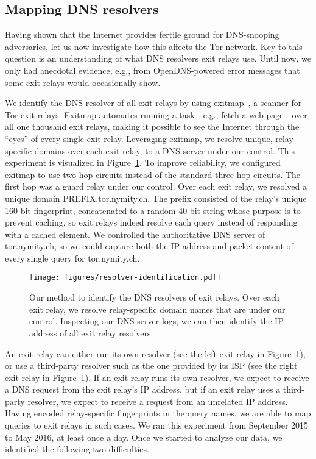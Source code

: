 \subsection{Mapping DNS resolvers}
\label{sec:mapping-resolvers}
Having shown that the Internet provides fertile ground for DNS-snooping
adversaries, let us now investigate how this affects the Tor network.  Key to
this question is an understanding of what DNS resolvers exit relays use.  Until
now, we only had anecdotal evidence, e.g., from OpenDNS-powered error messages
that some exit relays would occasionally show.

We identify the DNS resolver of all exit relays by using
exitmap~\cite{exitmap}, a scanner for Tor exit relays.  Exitmap automates
running a task---e.g., fetch a web page---over all one thousand exit relays,
making it possible to see the Internet through the ``eyes'' of every single
exit relay.  Leveraging exitmap, we resolve unique, relay-specific domains over
each exit relay, to a DNS server under our control.  This experiment is
visualized in Figure~\ref{fig:dnsenum}.  To improve reliability, we configured
exitmap to use two-hop circuits instead of the standard three-hop circuits.
The first hop was a guard relay under our control.  Over each exit relay, we
resolved a unique domain PREFIX.tor.nymity.ch.  The prefix consisted of the
relay's unique 160-bit fingerprint, concatenated to a random 40-bit string
whose purpose is to prevent caching, so exit relays indeed resolve each query
instead of responding with a cached element.  We controlled the authoritative
DNS server of tor.nymity.ch, so we could capture both the IP address and packet
content of every single query for tor.nymity.ch.

\begin{figure}[t]
	\centering
	\texttt{[image: figures/resolver-identification.pdf]}
	\caption{Our method to identify the DNS resolvers of exit relays.  Over
	each exit relay, we resolve relay-specific domain names that are under our
	control.  Inspecting our DNS server logs, we can then identify the IP
	address of all exit relay resolvers.}
	\label{fig:dnsenum}
\end{figure}

An exit relay can either run its own resolver (see the left exit relay in
Figure~\ref{fig:dnsenum}), or use a third-party resolver such as the one
provided by its ISP (see the right exit relay in Figure~\ref{fig:dnsenum}).  If
an exit relay runs its own resolver, we expect to receive a DNS request from
the exit relay's IP address, but if an exit relay uses a third-party resolver,
we expect to receive a request from an unrelated IP address.  Having encoded
relay-specific fingerprints in the query names, we are able to map queries to
exit relays in such cases.  We ran this experiment from September 2015 to May
2016, at least once a day.  Once we started to analyze our data, we identified
the following two difficulties.

